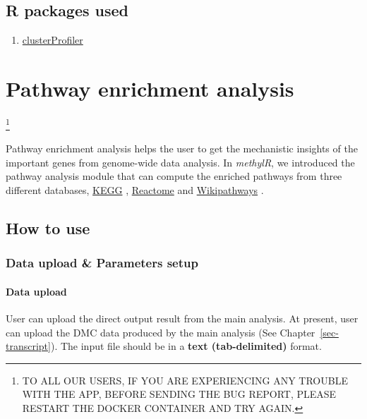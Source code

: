 \documentclass[
  a4paper,
  oneside,
  open=any]{scrreport}
\providecommand{\tightlist}{%
  \setlength{\itemsep}{0pt}\setlength{\parskip}{0pt}}\usepackage{longtable,booktabs,array}
\begin{document}
\hypertarget{r-packages-used-2}{%
\section{R packages used}\label{r-packages-used-2}}

\begin{enumerate}
\def\labelenumi{\arabic{enumi}.}
\tightlist
\item
  \href{https://bioconductor.org/packages/release/bioc/vignettes/clusterProfiler/inst/doc/clusterProfiler.html}{clusterProfiler}
\end{enumerate}

\hypertarget{sec-pathway}{%
\chapter{Pathway enrichment analysis}\label{sec-pathway}}

\footnote{TO ALL OUR USERS, IF YOU ARE EXPERIENCING ANY TROUBLE WITH THE
  APP, BEFORE SENDING THE BUG REPORT, PLEASE RESTART THE DOCKER
  CONTAINER AND TRY AGAIN.}

Pathway enrichment analysis helps the user to get the mechanistic
insights of the important genes from genome-wide data analysis. In
\emph{methylR}, we introduced the pathway analysis module that can
compute the enriched pathways from three different databases,
\href{https://www.genome.jp/kegg/}{KEGG} \autocite{Kanehisa2000},
\href{https://reactome.org/}{Reactome} \autocite{Gillespie2021} and
\href{https://www.wikipathways.org/}{Wikipathways}
\autocite{pico2008plos,martens2020nar}.

\hypertarget{how-to-use-5}{%
\section{How to use}\label{how-to-use-5}}

\hypertarget{data-upload-parameters-setup-1}{%
\subsection{Data upload \& Parameters
setup}\label{data-upload-parameters-setup-1}}

\hypertarget{data-upload-4}{%
\subsubsection{Data upload}\label{data-upload-4}}

User can upload the direct output result from the main analysis. At
present, user can upload the DMC data produced by the main analysis (See
Chapter~\ref{sec-transcript}). The input file should be in a
\textbf{text (tab-delimited)} format.
\end{document}

